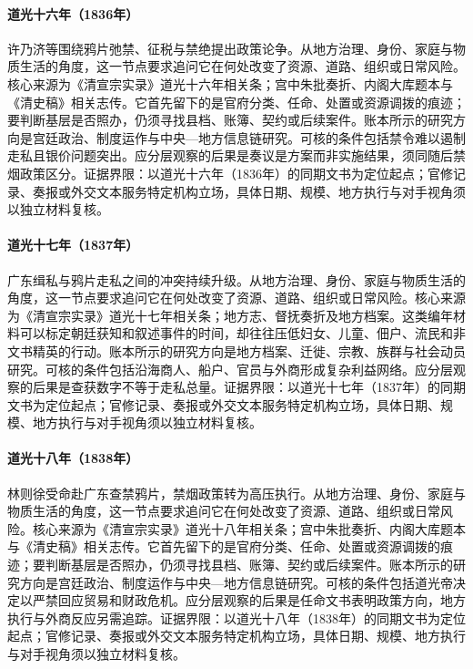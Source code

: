 \hypertarget{social:EQ-1836-OPIUM-LEGALIZATION-DEBATE}{}\paragraph{道光十六年（1836年）}许乃济等围绕鸦片弛禁、征税与禁绝提出政策论争。从地方治理、身份、家庭与物质生活的角度，这一节点要求追问它在何处改变了资源、道路、组织或日常风险。核心来源为《清宣宗实录》道光十六年相关条；宫中朱批奏折、内阁大库题本与《清史稿》相关志传。它首先留下的是官府分类、任命、处置或资源调拨的痕迹；要判断基层是否照办，仍须寻找县档、账簿、契约或后续案件。账本所示的研究方向是宫廷政治、制度运作与中央—地方信息链研究。可核的条件包括禁令难以遏制走私且银价问题突出。应分层观察的后果是奏议是方案而非实施结果，须同随后禁烟政策区分。证据界限：以道光十六年（1836年）的同期文书为定位起点；官修记录、奏报或外交文本服务特定机构立场，具体日期、规模、地方执行与对手视角须以独立材料复核。
\hypertarget{social:EQ-1837-CANTON-SMUGGLING}{}\paragraph{道光十七年（1837年）}广东缉私与鸦片走私之间的冲突持续升级。从地方治理、身份、家庭与物质生活的角度，这一节点要求追问它在何处改变了资源、道路、组织或日常风险。核心来源为《清宣宗实录》道光十七年相关条；地方志、督抚奏折及地方档案。这类编年材料可以标定朝廷获知和叙述事件的时间，却往往压低妇女、儿童、佃户、流民和非文书精英的行动。账本所示的研究方向是地方档案、迁徙、宗教、族群与社会动员研究。可核的条件包括沿海商人、船户、官员与外商形成复杂利益网络。应分层观察的后果是查获数字不等于走私总量。证据界限：以道光十七年（1837年）的同期文书为定位起点；官修记录、奏报或外交文本服务特定机构立场，具体日期、规模、地方执行与对手视角须以独立材料复核。
\hypertarget{social:EQ-1838-LIN-ZEXU-APPOINTMENT}{}\paragraph{道光十八年（1838年）}林则徐受命赴广东查禁鸦片，禁烟政策转为高压执行。从地方治理、身份、家庭与物质生活的角度，这一节点要求追问它在何处改变了资源、道路、组织或日常风险。核心来源为《清宣宗实录》道光十八年相关条；宫中朱批奏折、内阁大库题本与《清史稿》相关志传。它首先留下的是官府分类、任命、处置或资源调拨的痕迹；要判断基层是否照办，仍须寻找县档、账簿、契约或后续案件。账本所示的研究方向是宫廷政治、制度运作与中央—地方信息链研究。可核的条件包括道光帝决定以严禁回应贸易和财政危机。应分层观察的后果是任命文书表明政策方向，地方执行与外商反应另需追踪。证据界限：以道光十八年（1838年）的同期文书为定位起点；官修记录、奏报或外交文本服务特定机构立场，具体日期、规模、地方执行与对手视角须以独立材料复核。
